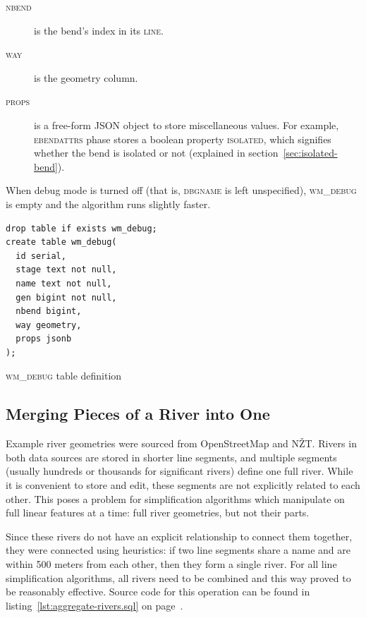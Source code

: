\documentclass[a4paper]{article}
\newcommand{\onpage}[1]{\ref{#1} on page~\pageref{#1}}
\begin{document}
\begin{description}
    \item[\normalfont\textsc{nbend}] is the bend's index in its \textsc{line}.

    \item[\normalfont\textsc{way}] is the geometry column.

    \item[\normalfont\textsc{props}] is a free-form JSON object to store
        miscellaneous values. For example, \textsc{ebendattrs} phase stores a
        boolean property \textsc{isolated}, which signifies whether the bend is
        isolated or not (explained in section~\ref{sec:isolated-bend}).

\end{description}

When debug mode is turned off (that is, \textsc{dbgname} is left unspecified),
\textsc{wm\_debug} is empty and the algorithm runs slightly faster.

\begin{listing}[h!]
    \begin{verbatim}
drop table if exists wm_debug;
create table wm_debug(
  id serial,
  stage text not null,
  name text not null,
  gen bigint not null,
  nbend bigint,
  way geometry,
  props jsonb
);
    \end{verbatim}
    \caption{\textsc{wm\_debug} table definition}
    \label{lst:wm-debug-sql}
\end{listing}


\subsection{Merging Pieces of a River into One}

Example river geometries were sourced from OpenStreetMap\cite{openstreetmap}
and NŽT\cite{nzt}. Rivers in both data sources are stored in shorter line
segments, and multiple segments (usually hundreds or thousands for significant
rivers) define one full river. While it is convenient to store and edit, these
segments are not explicitly related to each other. This poses a problem for
simplification algorithms which manipulate on full linear features at a time:
full river geometries, but not their parts.

Since these rivers do not have an explicit relationship to connect them
together, they were connected using heuristics: if two line segments share a
name and are within 500 meters from each other, then they form a single river.
For all line simplification algorithms, all rivers need to be combined and
this way proved to be reasonably effective. Source code for this operation can
be found in listing~\onpage{lst:aggregate-rivers.sql}.
\end{document}
